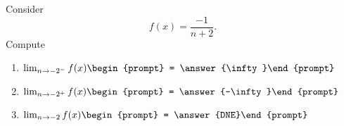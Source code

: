 \documentclass{ximera}
\author{Bart Snapp}
\begin{document}
\begin{exercise}
Consider 
\[
f(x) = \frac{-1}{n+2}.
\]
Compute
\begin{enumerate}
\item $\lim_{n\to -2^- } f(x) \begin{prompt} = \answer{\infty}\end{prompt}$
\item $\lim_{n\to -2^+ } f(x) \begin{prompt} = \answer{-\infty}\end{prompt}$
\item $\lim_{n\to -2 } f(x) \begin{prompt} = \answer{DNE}\end{prompt}$
\end{enumerate}
\end{exercise}
\end{document}
